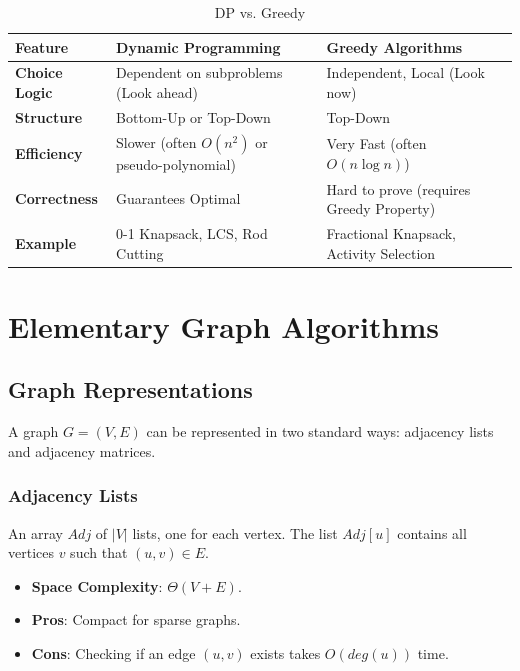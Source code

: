 \documentclass[12pt]{article}
\theoremstyle{blueplain}
\theoremstyle{bluedef}
\theoremstyle{blueremark}
\begin{document}
\begin{table}[h]
    \centering
    \begin{tabular}{|l|l|l|}
        \hline
        \textbf{Feature}      & \textbf{Dynamic Programming}                 & \textbf{Greedy Algorithms}               \\ \hline
        \textbf{Choice Logic} & Dependent on subproblems (Look ahead)        & Independent, Local (Look now)            \\ \hline
        \textbf{Structure}    & Bottom-Up or Top-Down                        & Top-Down                                 \\ \hline
        \textbf{Efficiency}   & Slower (often $O(n^2)$ or pseudo-polynomial) & Very Fast (often $O(n \log n)$)          \\ \hline
        \textbf{Correctness}  & Guarantees Optimal                           & Hard to prove (requires Greedy Property) \\ \hline
        \textbf{Example}      & 0-1 Knapsack, LCS, Rod Cutting               & Fractional Knapsack, Activity Selection  \\ \hline
    \end{tabular}
    \caption{DP vs. Greedy}
\end{table}

\clearpage


\section{Elementary Graph Algorithms}

\subsection{Graph Representations}

A graph $G = (V, E)$ can be represented in two standard ways: adjacency lists and adjacency matrices.

\subsubsection{Adjacency Lists}
An array $Adj$ of $|V|$ lists, one for each vertex. The list $Adj[u]$ contains all vertices $v$ such that $(u, v) \in E$.
\begin{itemize}
    \item \textbf{Space Complexity}: $\Theta(V + E)$.
    \item \textbf{Pros}: Compact for sparse graphs.
    \item \textbf{Cons}: Checking if an edge $(u, v)$ exists takes $O(deg(u))$ time.
\end{itemize}
\end{document}
